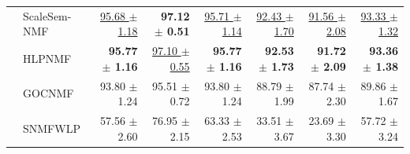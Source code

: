 \begin{tabular}{llrrrrrr}
\addlinespace
\multirow{4}{*}{PIE} & ScaleSem-NMF & \underline{95.68 $\pm$ 1.18} & \textbf{97.12 $\pm$ 0.51} & \underline{95.71 $\pm$ 1.14} & \underline{92.43 $\pm$ 1.70} & \underline{91.56 $\pm$ 2.08} & \underline{93.33 $\pm$ 1.32} \\
 & HLPNMF & \textbf{95.77 $\pm$ 1.16} & \underline{97.10 $\pm$ 0.55} & \textbf{95.77 $\pm$ 1.16} & \textbf{92.53 $\pm$ 1.73} & \textbf{91.72 $\pm$ 2.09} & \textbf{93.36 $\pm$ 1.38} \\
 & GOCNMF & 93.80 $\pm$ 1.24 & 95.51 $\pm$ 0.72 & 93.80 $\pm$ 1.24 & 88.79 $\pm$ 1.99 & 87.74 $\pm$ 2.30 & 89.86 $\pm$ 1.67 \\
 & SNMFWLP & 57.56 $\pm$ 2.60 & 76.95 $\pm$ 2.15 & 63.33 $\pm$ 2.53 & 33.51 $\pm$ 3.67 & 23.69 $\pm$ 3.30 & 57.72 $\pm$ 3.24 \\
\end{tabular}
